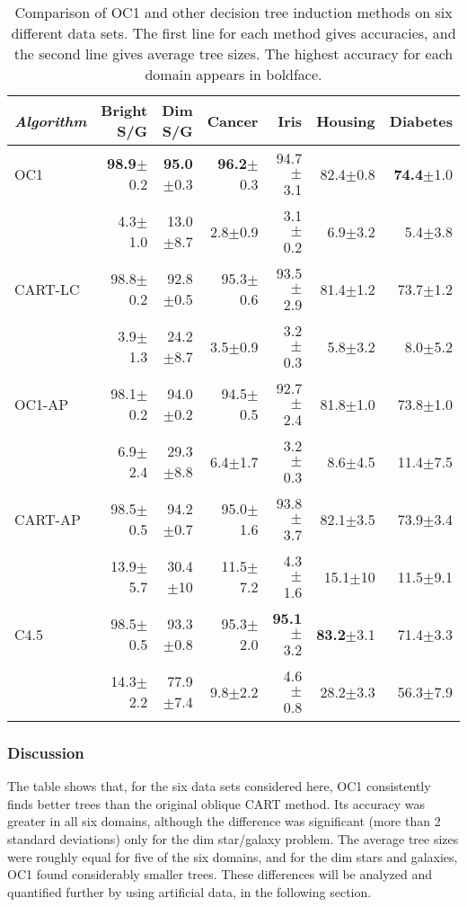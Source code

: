 \begin{table}
\begin{center}
\begin{tabular}{|l|r|r|r|r|r|r|} \hline \hline
{\em Algorithm} &Bright S/G & Dim S/G & Cancer & Iris  & 
                 Housing    & Diabetes   \\ \hline 
OC1     & {\bf 98.9}$\pm$0.2 & {\bf 95.0}$\pm$0.3 & {\bf 96.2}$\pm$0.3 
          & 94.7$\pm$3.1 & 82.4$\pm$0.8 & {\bf 74.4}$\pm$1.0 \\
~       &  4.3$\pm$1.0 & 13.0$\pm$8.7 &  2.8$\pm$0.9 & 3.1$\pm$0.2 & 
                 6.9$\pm$3.2 & 5.4$\pm$3.8 \\ \hline
CART-LC & 98.8$\pm$0.2 & 92.8$\pm$0.5 & 95.3$\pm$0.6 & 93.5$\pm$2.9 &
                 81.4$\pm$1.2 & 73.7$\pm$1.2 \\
~       &  3.9$\pm$1.3 & 24.2$\pm$8.7 &  3.5$\pm$0.9 & 3.2$\pm$0.3 & 
                  5.8$\pm$3.2 & 8.0$\pm$5.2 \\ \hline
OC1-AP  & 98.1$\pm$0.2 & 94.0$\pm$0.2 & 94.5$\pm$0.5 & 92.7$\pm$2.4 &
                 81.8$\pm$1.0 & 73.8$\pm$1.0 \\
~       &  6.9$\pm$2.4 & 29.3$\pm$8.8 &  6.4$\pm$1.7 & 3.2$\pm$0.3 & 
                 8.6$\pm$4.5 &11.4$\pm$7.5 \\ \hline
CART-AP & 98.5$\pm$0.5 & 94.2$\pm$0.7 & 95.0$\pm$1.6 & 93.8$\pm$3.7 &
                 82.1$\pm$3.5 & 73.9$\pm$3.4 \\ 
~       & 13.9$\pm$5.7 & 30.4$\pm$10  & 11.5$\pm$7.2 & 4.3$\pm$1.6 &
                 15.1$\pm$10 & 11.5$\pm$9.1 \\ \hline
C4.5    & 98.5$\pm$0.5 & 93.3$\pm$0.8 & 95.3$\pm$2.0 & {\bf 95.1}$\pm$3.2 &
                 {\bf 83.2}$\pm$3.1 &71.4$\pm$3.3 \\
~       & 14.3$\pm$2.2 & 77.9$\pm$7.4 &  9.8$\pm$2.2 & 4.6$\pm$0.8 &
                 28.2$\pm$3.3 & 56.3$\pm$7.9 \\ \hline \hline
\end{tabular}
\caption{Comparison of OC1 and other decision tree induction methods on
six different data sets.  The first line for each method gives accuracies,
and the second line gives average tree sizes.  The highest accuracy for
each domain appears in boldface.}
\label{table:1}
\vspace*{-.2in}
\end{center}
\end{table}

\subsubsection{Discussion}
The table shows that, for the six data sets considered here, OC1
consistently finds better trees than the original oblique CART method.
Its accuracy was greater in all six domains, although the difference
was significant (more than 2 standard deviations) only for the dim
star/galaxy problem.  The average tree sizes were roughly equal for
five of the six domains, and for the dim stars and galaxies, OC1 found
considerably smaller trees.  These differences will be analyzed and
quantified further by using artificial data, in the following section.

